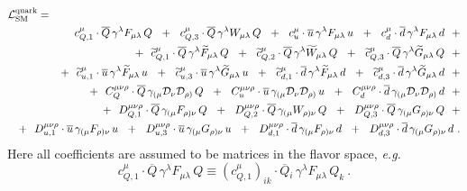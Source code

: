 \documentclass[12pt]{revtex4}
\newcommand{\wt}{\widetilde}
\newcommand{\ov}{\overline}
\newcommand{\md}{\mathcal{D}}
\begin{document}
\begin{eqnarray}
\nonumber
\lefteqn{
	\mathcal{L}_{\rm SM}^{\rm quark} =
	}
	\\
\nonumber
	&&
	\phantom{+~~}
	c_{Q,1}^\mu \cdot
	\ov{Q}\, \gamma^\lambda F_{\mu\lambda}\, Q 
	~~+~~
	c_{Q,3}^\mu \cdot
	\ov{Q}\, \gamma^\lambda W_{\mu\lambda}\, Q 
	~~+~~
	c_{u}^\mu \cdot
	\ov{u}\, \gamma^\lambda F_{\mu\lambda}\, u
	~~+~~ 
	c_{d}^\mu \cdot
	\ov{d}\, \gamma^\lambda F_{\mu\lambda}\, d
	~~+
	\\
\label{SM_quark}
	&&
	+~~
	\wt{c}_{Q,1}^\mu \cdot
	\ov{Q}\, \gamma^\lambda \wt{F}_{\mu\lambda}\, Q 
	~~+~~
	\wt{c}_{Q,2}^\mu \cdot
	\ov{Q}\, \gamma^\lambda \wt{W}_{\mu\lambda}\, Q 
	~~+~~
	\wt{c}_{Q,3}^\mu \cdot
	\ov{Q}\, \gamma^\lambda \wt{G}_{\mu\lambda}\, Q 
	~~+
	\\
\nonumber
	&&
	+~~
	\wt{c}_{u,1}^\mu \cdot
	\ov{u}\, \gamma^\lambda \wt{F}_{\mu\lambda}\, u
	~~+~~ 
	\wt{c}_{u,3}^\mu \cdot
	\ov{u}\, \gamma^\lambda \wt{G}_{\mu\lambda}\, u
	~~+~~ 
	\wt{c}_{d,1}^\mu \cdot
	\ov{d}\, \gamma^\lambda \wt{F}_{\mu\lambda}\, d
	~~+~~ 
	\wt{c}_{d,3}^\mu \cdot
	\ov{d}\, \gamma^\lambda \wt{G}_{\mu\lambda}\, d
	~~+
	\\
\nonumber
	&&
	+~~
	C_Q^{\mu\nu\rho} \cdot
	\ov{Q}\, \gamma_{(\mu} \md_\nu \md_{\rho)}\, Q
	~~+~~
	C_u^{\mu\nu\rho} \cdot
	\ov{u}\, \gamma_{(\mu} \md_\nu \md_{\rho)}\, u
	~~+~~
	C_d^{\mu\nu\rho} \cdot
	\ov{d}\, \gamma_{(\mu} \md_\nu \md_{\rho)}\, d
	~~+
	\\
\nonumber
	&&
	+~~
	D_{Q,1}^{\mu\nu\rho} \cdot
	\ov{Q}\, \gamma_{(\mu} F_{\rho)\nu}\, Q
	~~+~~
	D_{Q,2}^{\mu\nu\rho} \cdot
	\ov{Q}\, \gamma_{(\mu} W_{\rho)\nu}\, Q
	~~+~~
	D_{Q,3}^{\mu\nu\rho} \cdot
	\ov{Q}\, \gamma_{(\mu} G_{\rho)\nu}\, Q
	~~+
	\\
\nonumber
	&&
	+~~
	D_{u,1}^{\mu\nu\rho} \cdot
	\ov{u}\, \gamma_{(\mu} F_{\rho)\nu}\, u
	~~+~~
	D_{u,3}^{\mu\nu\rho} \cdot
	\ov{u}\, \gamma_{(\mu} G_{\rho)\nu}\, u
	~~+~~
	D_{d,1}^{\mu\nu\rho} \cdot
	\ov{d}\, \gamma_{(\mu} F_{\rho)\nu}\, d
	~~+~~
	D_{d,3}^{\mu\nu\rho} \cdot
	\ov{d}\, \gamma_{(\mu} G_{\rho)\nu}\, d
	~.
\end{eqnarray}
	Here all coefficients are assumed to be matrices in the 
	flavor space, {\it e.g.}
\[
	c_{Q,1}^\mu \cdot
	\ov{Q}\, \gamma^\lambda F_{\mu\lambda}\, Q 
	\equiv
	\left(c_{Q,1}^\mu\right)_{ik} \cdot
	\ov{Q}{}_i\, \gamma^\lambda F_{\mu\lambda}\, Q_k
	~. 
\]
\end{document}
